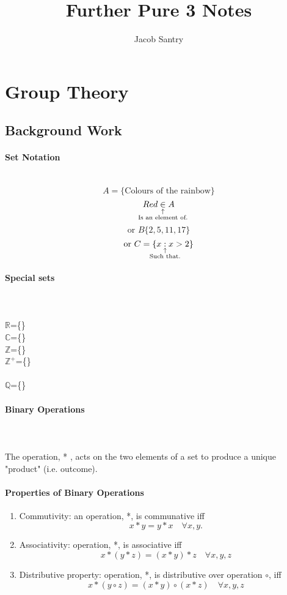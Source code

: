 \documentclass[a4paper]{article}
\title{Further Pure 3 Notes}
\author{Jacob Santry}
\begin{document}
\maketitle
\tableofcontents

\section{Group Theory}
\subsection{Background Work}
\normalsize
\paragraph{Set Notation}\mbox{}\\
\large
\[ A=\{\text{Colours of the rainbow}\} \]
\[ Red \underset{\mathclap{\substack{\uparrow \\ \text{Is an element of.}}}}{\in} A \]
\[ \text{or } B\{2,5,11,17\}\]
\[ \text{or } C =\{x \underset{\mathclap{\substack{\uparrow \\ \text{Such that.}}}}{:} x>2 \}\]

\normalsize
\paragraph{Special sets}\mbox{}\\ \\
\large
$\mathbb{R}$=\{\} \\
$\mathbb{C}$=\{\}  \\
$\mathbb{Z}$=\{\} \\
$\mathbb{Z^+}$=\{\}  \\
\text{    }\big[ \text{also } \mathbb{N}=\{\text{Natural numbers}\} \big] \\
$\mathbb{Q}$=\{\}

\normalsize
\paragraph{Binary Operations}\mbox{}\\ \\
The operation, * , acts on the two elements of a set to produce a unique "product" (i.e. outcome).

\paragraph{Properties of Binary Operations}\mbox{}
\begin{enumerate}
\item
  Commutivity: an operation, *, is communative iff
  \Large
  \[ x * y = y * x \quad \forall x,y. \]
  \normalsize
\item
  Associativity: operation, *, is associative iff
  \Large
  \[ x*(y*z) = (x*y)*z \quad \forall x,y,z \]
  \normalsize
\item
  Distributive property: operation, *, is distributive over operation $\circ$, iff
  \Large
  \[ x*(y\circ z) = (x * y)\circ(x * z) \quad \forall x,y,z \]
  \normalsize
\end{enumerate}
\end{document}
